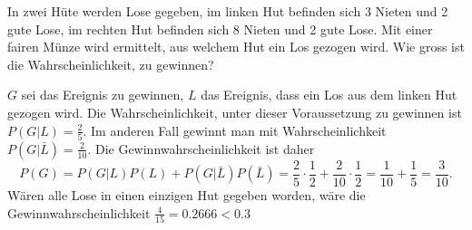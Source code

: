 In zwei Hüte werden Lose gegeben, im linken Hut befinden sich
3 Nieten  und 2 gute Lose, im rechten Hut befinden sich 8 Nieten
und 2 gute Lose. Mit einer fairen Münze wird ermittelt, aus welchem
Hut ein Los gezogen wird. Wie gross ist die Wahrscheinlichkeit, zu
gewinnen?


\begin{loesung}
$G$ sei das Ereignis zu gewinnen,
$L$ das Ereignis, dass ein Los aus dem linken Hut gezogen wird.
Die Wahrscheinlichkeit, unter dieser Voraussetzung zu gewinnen ist
$P(G|L)=\frac25$. Im anderen Fall gewinnt man mit Wahrscheinlichkeit
$P(G|\bar L)=\frac2{10}$. Die Gewinnwahrscheinlichkeit ist daher
$$P(G)=P(G|L)P(L)+P(G|\bar L)P(\bar L)=\frac25\cdot \frac12+\frac2{10}\cdot\frac12=\frac1{10}+\frac15=\frac3{10}.$$
Wären alle Lose in einen einzigen Hut gegeben worden, wäre die
Gewinnwahrscheinlichkeit $\frac{4}{15}=0.2666<0.3$
\end{loesung}

